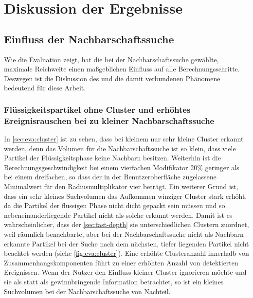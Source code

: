 \chapter{Diskussion der Ergebnisse}\label{sec:diskussion}

\section{Einfluss der Nachbarschaftssuche}\label{sec:eva:nachbarschaftssuche}

Wie die Evaluation zeigt, hat die bei der Nachbarschaftssuche gewählte, maximale Reichweite einen maßgeblichen Einfluss auf alle Berechnungsschritte. Deswegen ist die Diskussion des  und die damit verbundenen Phänomene bedeutend für diese Arbeit.

\subsection*{Flüssigkeitspartikel ohne Cluster und erhöhtes Ereignisrauschen bei zu kleiner Nachbarschaftssuche}
In \autoref{sec:eva:cluster} ist zu sehen, dass bei kleinem  nur sehr kleine Cluster erkannt werden, denn das Volumen für die Nachbarschaftssuche ist so klein, dass viele Partikel der Flüssigkeitsphase keine Nachbarn besitzen. Weiterhin ist die Berechnungsgeschwindigkeit bei einem vierfachen Modifikator 20\% geringer als bei einem dreifachen, so dass der in der Benutzeroberfläche zugelassene Minimalwert für den Radiusmultiplikator vier beträgt. Ein weiterer Grund ist, dass ein sehr kleines Suchvolumen das Aufkommen winziger Cluster stark erhöht, da die Partikel der flüssigen Phase nicht dicht gepackt sein müssen und so nebeneinanderliegende Partikel nicht als solche erkannt werden. 
Damit ist es wahrscheinlicher, dass der \CFD \autoref{sec:fast-depth} sie unterschiedlichen Clustern zuordnet, weil räumlich benachbarte, aber bei der Nachbarschaftssuche nicht als Nachbarn erkannte Partikel bei der Suche nach dem nächsten, tiefer liegenden Partikel nicht beachtet werden (siehe \autoref{fig:eva:cluster}). Eine erhöhte Clusteranzahl innerhalb von Zusammenhangskomponenten führt zu einer erhöhten Anzahl von detektierten Ereignissen. Wenn der Nutzer den Einfluss kleiner Cluster ignorieren möchte und sie als  statt als gewinnbringende Information betrachtet, so ist ein kleines Suchvolumen bei der Nachbarschaftssuche von Nachteil.

